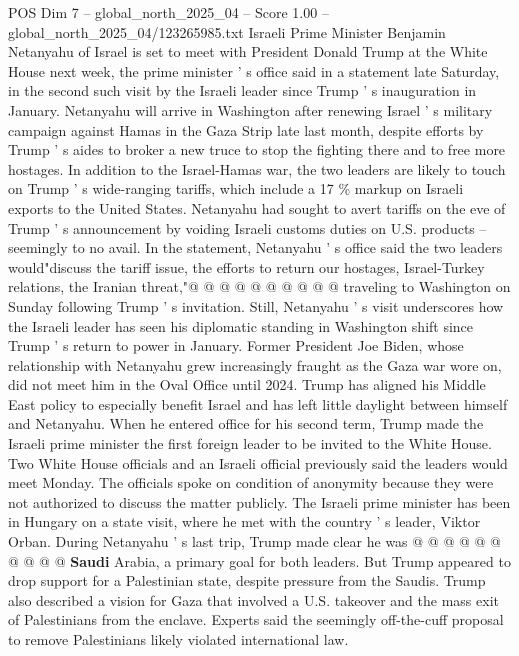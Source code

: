 \begin{textsample}{POS Dim 7 – global\_north\_2025\_04 – Score 1.00 – global\_north\_2025\_04/123265985.txt}  \label{ex:f7_pos_359}
Israeli Prime Minister Benjamin Netanyahu of Israel is set to meet with President Donald Trump at the White House next week, the prime minister ' s office said in a statement late Saturday, in the second such visit by the Israeli leader since Trump ' s inauguration in January.
Netanyahu will arrive in Washington after renewing Israel ' s military campaign against Hamas in the Gaza Strip late last month, despite efforts by Trump ' s aides to broker a new truce to stop the fighting there and to free more hostages.
In addition to the Israel-Hamas war, the two leaders are likely to touch on Trump ' s wide-ranging tariffs, which include a 17 \% markup on Israeli exports to the United States.
Netanyahu had sought to avert tariffs on the eve of Trump ' s announcement by voiding Israeli customs duties on U.S. products -- seemingly to no avail.
In the statement, Netanyahu ' s office said the two leaders would"discuss the tariff issue, the efforts to return our hostages, Israel-Turkey relations, the Iranian threat,"@ @ @ @ @ @ @ @ @ @ traveling to Washington on Sunday following Trump ' s invitation.
Still, Netanyahu ' s visit underscores how the Israeli leader has seen his diplomatic standing in Washington shift since Trump ' s return to power in January.
Former President Joe Biden, whose relationship with Netanyahu grew increasingly fraught as the Gaza war wore on, did not meet him in the Oval Office until 2024.
Trump has aligned his Middle East policy to especially benefit Israel and has left little daylight between himself and Netanyahu.
When he entered office for his second term, Trump made the Israeli prime minister the first foreign leader to be invited to the White House.
Two White House officials and an Israeli official previously said the leaders would meet Monday.
The officials spoke on condition of anonymity because they were not authorized to discuss the matter publicly.
The Israeli prime minister has been in Hungary on a state visit, where he met with the country ' s leader, Viktor Orban.
During Netanyahu ' s last trip, Trump made clear he was @ @ @ @ @ @ @ @ @ @ \textbf{Saudi} Arabia, a primary goal for both leaders.
But Trump appeared to drop support for a Palestinian state, despite pressure from the Saudis.
Trump also described a vision for Gaza that involved a U.S. takeover and the mass exit of Palestinians from the enclave.
Experts said the seemingly off-the-cuff proposal to remove Palestinians likely violated international law.

\end{textsample}
